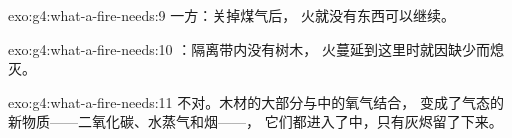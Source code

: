 \begin{solution}{exo:g4:what-a-fire-needs:9}
一方：关掉煤气后，
火就没有东西可以继续。
\end{solution}

\begin{solution}{exo:g4:what-a-fire-needs:10}
：隔离带内没有树木，
火蔓延到这里时就因缺少而熄灭。
\end{solution}

\begin{solution}{exo:g4:what-a-fire-needs:11}
不对。木材的大部分与中的氧气结合，
变成了气态的新物质——二氧化碳、水蒸气和烟——，
它们都进入了中，只有灰烬留了下来。
\end{solution}
